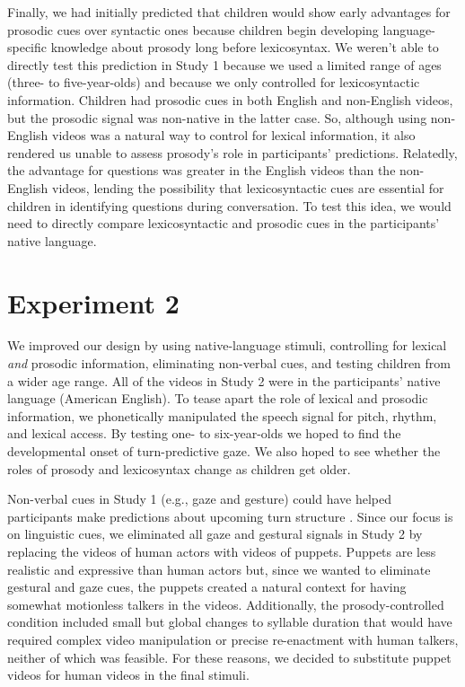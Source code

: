 \documentclass[authoryear, 12pt]{elsarticle}
\begin{document}
Finally, we had initially predicted that children would show early advantages for prosodic cues over syntactic ones because children begin developing language-specific knowledge about prosody long before lexicosyntax. We weren't able to directly test this prediction in Study 1 because we used a limited range of ages (three- to five-year-olds) and because we only controlled for lexicosyntactic information. Children had prosodic cues in both English and non-English videos, but the prosodic signal was non-native in the latter case. So, although using non-English videos was a natural way to control for lexical information, it also rendered us unable to assess prosody's role in participants' predictions. Relatedly, the advantage for questions was greater in the English videos than the non-English videos, lending the possibility that lexicosyntactic cues are essential for children in identifying questions during conversation. To test this idea, we would need to directly compare lexicosyntactic and prosodic cues in the participants' native language.




\section{Experiment 2}
\label{sec:exp2}

We improved our design by using native-language stimuli, controlling for lexical \textit{and} prosodic information, eliminating non-verbal cues, and testing children from a wider age range. All of the videos in Study 2 were in the participants' native language (American English). To tease apart the role of lexical and prosodic information, we phonetically manipulated the speech signal for pitch, rhythm, and lexical access. By testing one- to six-year-olds we hoped to find the developmental onset of turn-predictive gaze. We also hoped to see whether the roles of prosody and lexicosyntax change as children get older.

Non-verbal cues in Study 1 (e.g., gaze and gesture) could have helped participants make predictions about upcoming turn structure  \citep{rossano2009, stivers2010}. Since our focus is on linguistic cues, we eliminated all gaze and gestural signals in Study 2 by replacing the videos of human actors with videos of puppets. Puppets are less realistic and expressive than human actors but, since we wanted to eliminate gestural and gaze cues, the puppets created a natural context for having somewhat motionless talkers in the videos. Additionally, the prosody-controlled condition included small but global changes to syllable duration that would have required complex video manipulation or precise re-enactment with human talkers, neither of which was feasible. For these reasons, we decided to substitute puppet videos for human videos in the final stimuli. 
\end{document}
